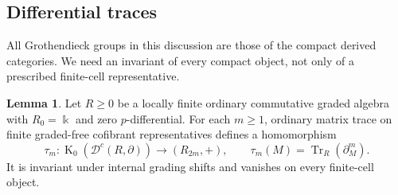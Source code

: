 \documentclass[11pt]{article}
\theoremstyle{definition}
\newtheorem{lem}[thm]{Lemma}
\numberwithin{equation}{section}
\newcommand{\kk}{\Bbbk}
\newcommand{\K}{\operatorname{K}_0}
\begin{document}
\subsection{Differential traces}
\label{sec:gap-traces}
All Grothendieck groups in this discussion are those of the compact
derived categories.  We need an invariant of every compact object, not
only of a prescribed finite-cell representative.

\begin{lem}\label{lem:gap-higher-traces}
Let $R\ge0$ be a locally finite ordinary commutative graded algebra with
$R_0=\kk$ and zero $p$-differential.  For each $m\ge1$, ordinary matrix
trace on finite graded-free cofibrant representatives defines a homomorphism
\begin{equation}\label{eq:gap-trace-map}
 \tau_m:\K(\mathcal D^c(R,\partial))\longrightarrow(R_{2m},+),\qquad
 \tau_m(M)=\operatorname{Tr}_R(\partial_M^m).
\end{equation}
It is invariant under internal grading shifts and vanishes on every
finite-cell object.
\end{lem}
\end{document}

